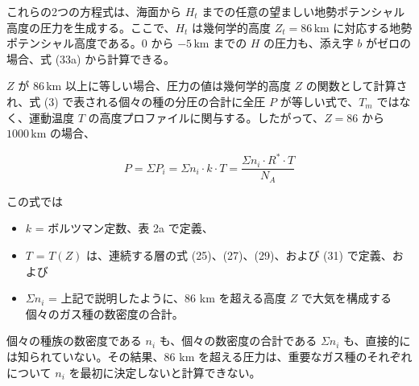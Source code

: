\documentclass{article}
\begin{document}
これらの2つの方程式は、海面から $H_t$ までの任意の望ましい地勢ポテンシャル高度の圧力を生成する。ここで、$H_t$ は幾何学的高度 $Z_t = 86 \, \text{km}$ に対応する地勢ポテンシャル高度である。$0$ から $-5 \, \text{km}$ までの $H$ の圧力も、添え字 $b$ がゼロの場合、式 (33a) から計算できる。

$Z$ が $86 \, \text{km}$ 以上に等しい場合、圧力の値は幾何学的高度 $Z$ の関数として計算され、式 (3) で表される個々の種の分圧の合計に全圧 $P$ が等しい式で、$T_m$ ではなく、運動温度 $T$ の高度プロファイルに関与する。したがって、$Z = 86$ から $1000 \, \text{km}$ の場合、

\[
P = \Sigma P_i = \Sigma n_i \cdot k \cdot T = \frac{\Sigma n_i \cdot R^* \cdot T}{N_A} \tag{33c}
\]

この式では

\begin{itemize}
    \item $k$ = ボルツマン定数、表 2a で定義、
    \item $T$ = $T(Z)$ は、連続する層の式 (25)、(27)、(29)、および (31) で定義、および
    \item $\Sigma n_i$ = 上記で説明したように、86 km を超える高度 $Z$ で大気を構成する個々のガス種の数密度の合計。
\end{itemize}

個々の種族の数密度である $n_i$ も、個々の数密度の合計である $\Sigma n_i$ も、直接的には知られていない。その結果、86 km を超える圧力は、重要なガス種のそれぞれについて $n_i$ を最初に決定しないと計算できない。
\end{document}
